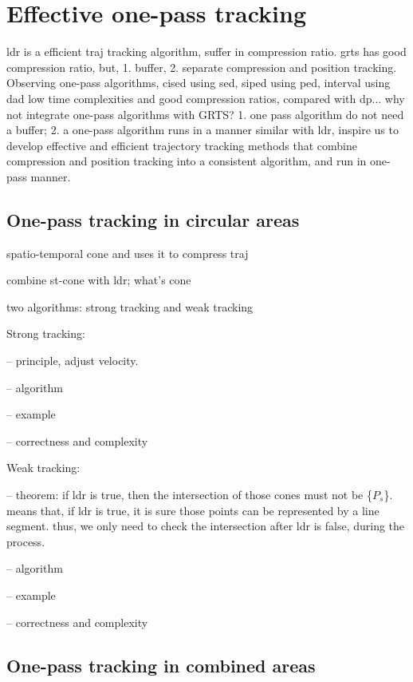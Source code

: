 

\section{Effective one-pass tracking}
\label{sec:traj}
ldr is a efficient traj tracking algorithm, suffer in compression ratio.
grts has good compression ratio, but, 1. buffer, 2. separate compression and position tracking.
Observing one-pass algorithms, cised using sed, siped using ped, interval using dad
low time complexities and good compression ratios, compared with dp...
why not integrate one-pass algorithms with GRTS? 
1. one pass algorithm do not need a buffer; 2. a one-pass algorithm runs in a manner similar with ldr, 
inspire us to develop effective and efficient trajectory tracking methods that combine compression and position tracking into a consistent algorithm, and run in one-pass manner. 

\subsection{One-pass tracking in circular areas}

spatio-temporal cone and uses it to compress traj

combine st-cone with ldr; what's cone


two algorithms: strong tracking and weak tracking

Strong tracking: 

-- principle, adjust velocity.

-- algorithm

-- example

-- correctness and complexity

Weak tracking:

-- theorem: if ldr is true, then the intersection of those cones must not be \{$P_s$\}.
means that, if ldr is true, it is sure those points can be represented by a line segment.
thus, we only need to check the intersection after ldr is false, during the process.

-- algorithm

-- example

-- correctness and complexity

\subsection{One-pass tracking in combined areas}

